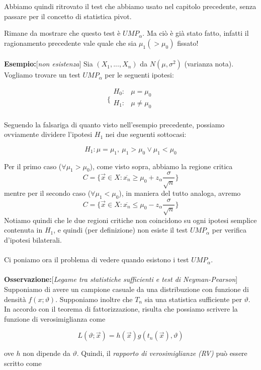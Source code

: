 Abbiamo quindi ritrovato il test che abbiamo usato nel capitolo precedente, senza passare per il concetto di statistica pivot.

Rimane da mostrare che questo test è $UMP_\alpha$. Ma ciò è già stato fatto, infatti il ragionamento precedente vale quale che sia $\mu_1 (> \mu_0)$ fissato!\\
\\
\textbf{Esempio:}[\textit{non esistenza}] Sia $(X_1,...,X_n)$ da $N(\mu,\sigma^2)$ (varianza nota).
Vogliamo trovare un test $UMP_\alpha$ per le seguenti ipotesi:

$$\bigg \{
\begin{array}{rl}
H_0: & \mu = \mu_0 \\
H_1: & \mu \neq \mu_0 \\
\end{array}
$$

Seguendo la falsariga di quanto visto nell'esempio precedente, possiamo ovviamente dividere l'ipotesi $H_1$ nei due seguenti sottocasi:

$$H_1: \mu = \mu_1,\ \mu_1 > \mu_0 \vee \mu_1 < \mu_0 $$

Per il primo caso ($ \forall \mu_1 > \mu_0$), come visto sopra, abbiamo la regione critica
$$C=\{ \vec{x} \in X : \overline{x_n} \geq \mu_0 + z_\alpha \frac{\sigma}{\sqrt{n}} \}$$ 
mentre per il secondo caso ($\forall \mu_1 < \mu_0$), in maniera del tutto analoga, avremo
$$C=\{ \vec{x} \in X : \overline{x_n} \leq \mu_0 - z_\alpha \frac{\sigma}{\sqrt{n}} \}$$  
Notiamo quindi che le due regioni critiche non coincidono su ogni ipotesi semplice contenuta in $H_1$, e quindi (per definizione) non esiste il test $UMP_\alpha$ per verifica d'ipotesi bilaterali.\\
\\
Ci poniamo ora il problema di vedere quando esistono i test $UMP_\alpha$.\\
\\
\noindent \textbf{Osservazione:}[\textit{Legame tra statistiche sufficienti e test di Neyman-Pearson}]
Supponiamo di avere un campione casuale da una distribuzione con funzione di densità $f(x;\vartheta)$.
Supponiamo inoltre che $T_n$ sia una statistica sufficiente per $\vartheta$.
In accordo con il teorema di fattorizzazione, risulta che possiamo scrivere la funzione di verosimiglianza come

$$L(\vartheta;\vec{x}) = h(\vec{x}) g(t_n(\vec{x}),\vartheta)$$

ove $h$ non dipende da $\vartheta$.
Quindi, il \textit{rapporto di verosimiglianze (RV)} può essere scritto come

